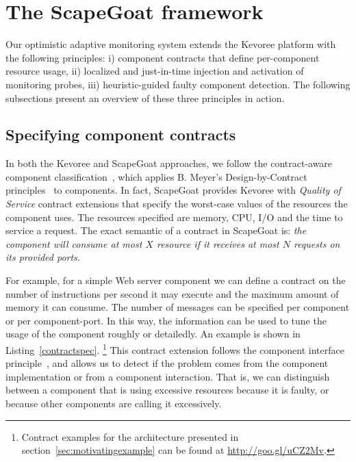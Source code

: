 \section{The ScapeGoat framework} \label{sec:approach}

Our optimistic adaptive monitoring system extends the Kevoree platform with the following principles: i) component contracts that define per-component resource usage, ii) localized and just-in-time injection and activation of monitoring probes, iii) heuristic-guided faulty component detection. The following subsections present an overview of these three principles in action. 


\subsection{Specifying component contracts}\label{componentcontract}

In both the Kevoree and ScapeGoat approaches, we follow the contract-aware component classification~\cite{Beugnard:1999:MCC:619042.621275}, which applies B. Meyer's Design-by-Contract principles~\cite{Meyer:1992:ADC:618974.619797} to components.
In fact, ScapeGoat provides Kevoree with \textit{Quality of Service} contract extensions that specify the worst-case values of the resources the component uses.
The resources specified are memory, CPU, I/O and the time to service a request.
The exact semantic of a contract in ScapeGoat is: \textit{the component will consume at most $X$ resource if it receives at most $N$ requests on its provided ports.}   

For example, for a simple Web server component we can define a contract on the number of instructions per second it may execute \cite{Binder200645} and the maximum amount of memory it can consume.
The number of messages can be specified per component or per component-port.
In this way, the information can be used to tune the usage of the component roughly or detailedly.
An example is shown in Listing~\ref{contractspec}.
\footnote{Contract examples for the architecture presented in section~\ref{sec:motivatingexample} can be found at \url{http://goo.gl/uCZ2Mv}.}
This contract extension follows the component interface principle~\cite{Henzinger03}, and allows us to detect if the problem comes from the component implementation or from a component interaction.
That is, we can distinguish between a component that is using excessive resources because it is faulty, or because other components are calling it excessively.


